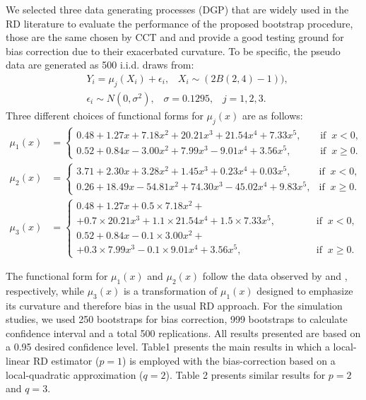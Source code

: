 \documentclass[12pt,fleqn]{article}
\begin{document}
We selected three data generating processes (DGP) that are widely used in the RD literature to evaluate the performance of the proposed bootstrap procedure, those are the same chosen by CCT and \cite{IK} and provide a good testing ground for bias correction due to their exacerbated curvature. To be specific, the pseudo data are generated as 500 i.i.d. draws from:
\begin{align*}
& Y_{i} = \mu_{j}(X_{i}) + \epsilon_{i}, \;\;\; X_{i} \sim  (2 B (2,4) - 1)), \\
& \epsilon_{i} \sim N(0, \sigma^{2}), \;\;\; \sigma = 0.1295, \;\;\; j = 1,2,3.
\end{align*}
Three different choices of functional forms for $\mu_{j}(x)$ are as follows:
\begin{align}
\mu_{1}(x) & = 
\begin{cases}
0.48 + 1.27x + 7.18x^{2} + 20.21x^{3} + 21.54x^{4} + 7.33x^{5}, \;\;\;\; & \text{if} \;\; x < 0, \\
0.52 + 0.84x - 3.00x^{2} + 7.99x^3 - 9.01x^4 + 3.56x^{5},  & \text{if} \;\; x \ge 0.
\end{cases}
\\
\mu_{2}(x) & = 
\begin{cases}
3.71 + 2.30x + 3.28x^2 + 1.45x^3 + 0.23x^4 + 0.03x^5, \;\; & \text{if} \;\; x < 0, \\
0.26 + 18.49x - 54.81x^2 + 74.30x^3 - 45.02x^4 + 9.83x^5,  & \text{if} \;\; x \ge 0.
\end{cases}
\\
\mu_{3}(x) & =
\begin{cases}
0.48 + 1.27x + 0.5 \times 7.18x^{2}+ \\
+ 0.7 \times 20.21x^3 + 1.1 \times 21.54x^4 + 1.5 \times 7.33x^5, \;\;\;\;\;\;\;\;\;\;\;\; & \text{if} \;\; x < 0, \\
0.52 + 0.84x - 0.1 \times 3.00x^{2}+ \\
+ 0.3 \times 7.99x^3 - 0.1 \times 9.01x^4 + 3.56x^5, & \text{if} \;\; x \ge 0.
\end{cases}
\end{align}

The functional form for $\mu_{1}(x)$ and $\mu_{2}(x)$ follow the data observed by \cite{lee2008} and \cite{ludwig2007}, respectively, while $\mu_{3}(x)$ is a transformation of $\mu_{1}(x)$ designed to emphasize its curvature and therefore bias in the usual RD approach. For the simulation studies, we used 250 bootstraps for bias correction, 999 bootstraps to calculate confidence interval and a total 500 replications. All results presented are based on a 0.95 desired confidence level. Table1 presents the main results in which a local-linear RD estimator ($p=1$) is employed with the bias-correction based on a local-quadratic approximation ($q=2$). Table 2 presents similar results for $p=2$ and $q=3$.
\end{document}
